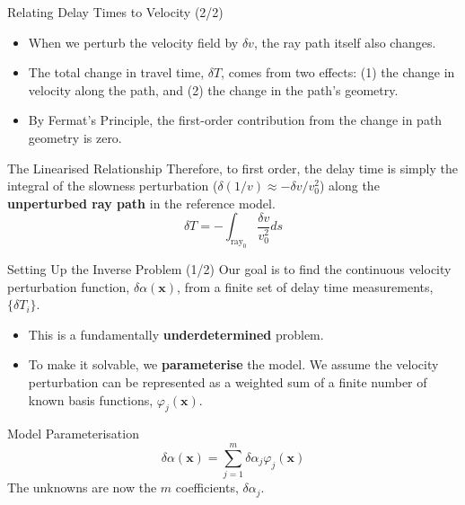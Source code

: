 \documentclass{beamer}
\begin{document}
\begin{frame}{Relating Delay Times to Velocity (2/2)}
    \begin{itemize}
        \item When we perturb the velocity field by $ \delta v $, the ray path itself also changes.
        \pause
        \item The total change in travel time, $ \delta T $, comes from two effects: (1) the change in velocity along the path, and (2) the change in the path's geometry.
        \pause
        \item By Fermat's Principle, the first-order contribution from the change in path geometry is zero.
    \end{itemize}
    \pause
    \begin{alertblock}{The Linearised Relationship}
        Therefore, to first order, the delay time is simply the integral of the slowness perturbation ($ \delta(1/v) \approx -\delta v / v_0^2 $) along the \textbf{unperturbed ray path} in the reference model.
        $$ \delta T = -\int_{\text{ray}_0} \frac{\delta v}{v_0^2} ds $$
    \end{alertblock}
\end{frame}


\begin{frame}{Setting Up the Inverse Problem (1/2)}
    Our goal is to find the continuous velocity perturbation function, $ \delta\alpha(\mathbf{x}) $, from a finite set of delay time measurements, $ \{\delta T_i\} $.
    \begin{itemize}
        \item This is a fundamentally \textbf{underdetermined} problem.
        \pause
        \item To make it solvable, we \textbf{parameterise} the model. We assume the velocity perturbation can be represented as a weighted sum of a finite number of known basis functions, $ \varphi_j(\mathbf{x}) $.
    \end{itemize}
    \begin{block}{Model Parameterisation}
        $$ \delta\alpha(\mathbf{x})=\sum_{j=1}^{m}\delta\alpha_{j}\varphi_{j}(\mathbf{x}) $$
        The unknowns are now the $m$ coefficients, $ \delta\alpha_j $.
    \end{block}
\end{frame}
\end{document}
